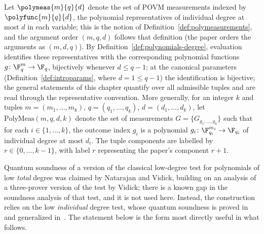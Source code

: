 \begin{definition}\label{def:ld-meas}
	\leanok
	Let $\polymeas{m}{q}{d}$ denote the set of POVM measurements indexed by $\polyfunc{m}{q}{d}$, the polynomial representatives of individual degree at most $d$ in each variable; this is the notion of Definition~\ref{def:polymeasurements}, and the argument order $(m,q,d)$ follows that definition (the paper orders the arguments as $(m,d,q)$). By Definition~\ref{def:polynomials-degree}, evaluation identifies these representatives with the corresponding polynomial functions $g\colon \F_q^m \to \F_q$, bijectively whenever $d \le q-1$; at the canonical parameters (Definition~\ref{def:introparams}, where $d = 1 \le q-1$) the identification is bijective; the general statements of this chapter quantify over all admissible tuples and are read through the representative convention. More generally, for an integer $k$ and tuples $m = (m_1,\ldots,m_k)$, $q = (q_1,\ldots,q_k)$, $d = (d_1,\ldots,d_k)$, let $\mathrm{PolyMeas}(m,q,d,k)$ denote the set of measurements $G = \{G_{g_1,\ldots,g_k}\}$ such that for each $i \in \{1,\ldots,k\}$, the outcome index $g_i$ is a polynomial $g_i\colon \F_{q_i}^{m_i} \to \F_{q_i}$ of individual degree at most $d_i$.
	The tuple components are labelled by $r\in\{0,\ldots,k-1\}$, with
	label $r$ representing the paper's component $r+1$.
\end{definition}

Quantum soundness of a version of the classical low-degree test for polynomials of low \emph{total} degree was claimed by Natarajan and Vidick, building on an analysis of a three-prover version of the test by Vidick; there is a known gap in the soundness analysis of that test, and it is not used here. Instead, the construction relies on the low \emph{individual} degree test, whose quantum soundness is proved in~\cite{Ji2020LowIndividualDegree} and generalized in~\cite{Ji2021Quantum}. The statement below is the form most directly useful in what follows.

